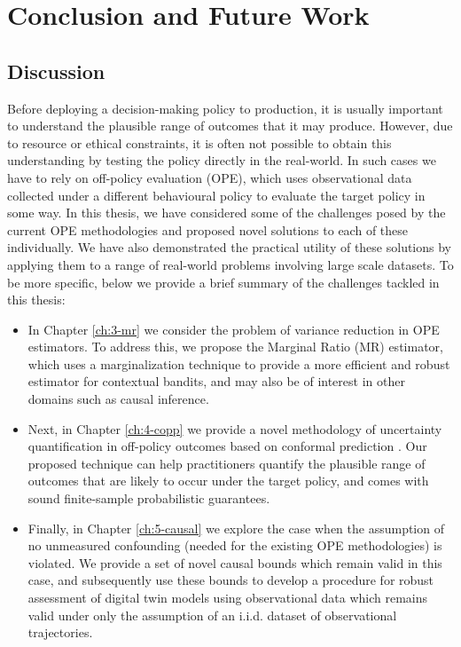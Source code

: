 \chapter{\label{ch:6-conclusion}Conclusion and Future Work} 

\minitoc

\section{Discussion}

Before deploying a decision-making policy to production, it is usually important to understand the
plausible range of outcomes that it may produce. However, due to resource or ethical constraints, it is
often not possible to obtain this understanding by testing the policy directly in the real-world. In such
cases we have to rely on off-policy evaluation (OPE), which uses observational data collected under a different behavioural policy to evaluate the target policy in some way. 
In this thesis, we have considered some of the challenges posed by the current OPE methodologies and proposed novel solutions to each of these individually.
We have also demonstrated the practical utility of these solutions by applying them to a range of real-world problems involving large scale datasets.
To be more specific, below we provide a brief summary of the challenges tackled in this thesis:
\begin{itemize}
    \item In Chapter \ref*{ch:3-mr} we consider the problem of variance reduction in OPE estimators. To address this, we propose the Marginal Ratio (MR) estimator, which uses a marginalization technique to provide a more efficient and robust estimator for contextual bandits, and may also be of interest in other domains such as causal inference. 
    \item Next, in Chapter \ref*{ch:4-copp} we provide a novel methodology of uncertainty quantification in off-policy outcomes based on conformal prediction \citep{vovk2005algorithmic}. Our proposed technique can help practitioners quantify the plausible range of outcomes that are likely to occur under the target policy, and comes with sound finite-sample probabilistic guarantees.
    \item Finally, in Chapter \ref*{ch:5-causal} we explore the case when the assumption of no unmeasured confounding (needed for the existing OPE methodologies) is violated. 
    We provide a set of novel causal bounds which remain valid in this case, and subsequently use these bounds to develop a procedure for robust assessment of digital twin models using observational data which remains valid under only the assumption of an i.i.d. dataset of observational trajectories. 
\end{itemize}

